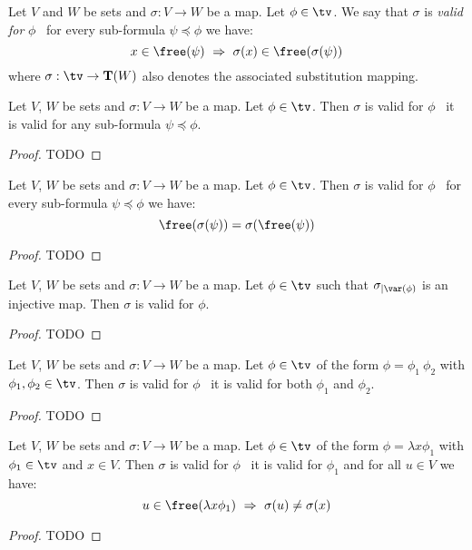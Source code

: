 \begin{defin}\label{logic:def:LAM:valid:substitution}
    Let $V$ and $W$ be sets and $\sigma:V\to W$ be a map. Let
    $\phi\in\tv$. We say that $\sigma$ is {\em valid for} $\phi$ \ifand\
    for every sub-formula $\psi\preceq\phi$ we have:
    \[
        x\in\free(\psi)\ \Rightarrow\ \sigma(x)\in\free(\sigma(\psi))
    \]
    where $\sigma:\tv\to{\bf T}(W)$ also denotes the associated substitution 
    mapping.
\end{defin}

\begin{prop}\label{logic:prop:LAM:valid:subformula}
    Let $V$, $W$ be sets and $\sigma:V\to W$ be a map. Let $\phi\in\tv$. 
    Then $\sigma$ is valid for $\phi$ \ifand\ it is valid for any sub-formula 
    $\psi\preceq\phi$.
\end{prop}
\begin{proof}
TODO
\end{proof}

\begin{prop}\label{logic:prop:LAM:valid:free:commute}
    Let $V$, $W$ be sets and $\sigma:V\to W$ be a map. Let $\phi\in\tv$. 
    Then $\sigma$ is valid for $\phi$ \ifand\ for every sub-formula 
    $\psi\preceq\phi$ we have:
    \[
        \free(\sigma(\psi)) =\sigma(\free(\psi))
    \]
\end{prop}
\begin{proof}
TODO
\end{proof}

\begin{prop}\label{logic:prop:LAM:valid:injective}
    Let $V$, $W$ be sets and $\sigma:V\to W$ be a map. Let $\phi\in\tv$ 
    such that $\sigma_{|\var(\phi)}$ is an injective map. Then $\sigma$ 
    is valid for $\phi$.
\end{prop}
\begin{proof}
TODO
\end{proof}

\begin{prop}\label{logic:prop:LAM:valid:recursion:imp}
    Let $V$, $W$ be sets and $\sigma:V\to W$ be a map. Let $\phi\in\tv$ 
    of the form $\phi=\phi_{1}\ \phi_{2}$ with $\phi_{1},\phi_{2}\in\tv$. 
    Then $\sigma$ is valid for $\phi$ \ifand\ it is valid for both $\phi_{1}$ 
    and $\phi_{2}$.
\end{prop}
\begin{proof}
TODO
\end{proof}

\begin{prop}\label{logic:prop:LAM:valid:recursion:quant}
    Let $V$, $W$ be sets and $\sigma:V\to W$ be a map. Let $\phi\in\tv$ 
    of the form $\phi=\lambda x\phi_{1}$ with $\phi_{1}\in\tv$ and $x\in V$. 
    Then $\sigma$ is valid for $\phi$ \ifand\ it is valid for $\phi_{1}$ 
    and for all $u\in V$ we have:
    \[
        u\in\free(\lambda x\phi_{1})\ \Rightarrow\ \sigma(u)\neq\sigma(x)
    \]
\end{prop}
\begin{proof}
TODO
\end{proof}

